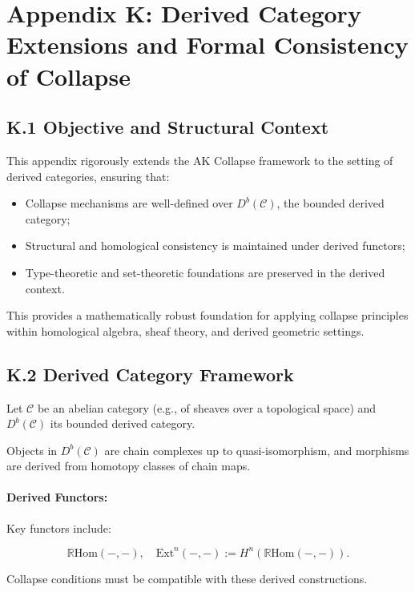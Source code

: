 \documentclass[11pt]{article}
\begin{document}
\section*{Appendix K: Derived Category Extensions and Formal Consistency of Collapse}

\subsection*{K.1 Objective and Structural Context}

This appendix rigorously extends the AK Collapse framework to the setting of derived categories, ensuring that:

\begin{itemize}
    \item Collapse mechanisms are well-defined over \( D^b(\mathcal{C}) \), the bounded derived category;
    \item Structural and homological consistency is maintained under derived functors;
    \item Type-theoretic and set-theoretic foundations are preserved in the derived context.
\end{itemize}

This provides a mathematically robust foundation for applying collapse principles within homological algebra, sheaf theory, and derived geometric settings.

\subsection*{K.2 Derived Category Framework}

Let \( \mathcal{C} \) be an abelian category (e.g., of sheaves over a topological space) and \( D^b(\mathcal{C}) \) its bounded derived category.

Objects in \( D^b(\mathcal{C}) \) are chain complexes up to quasi-isomorphism, and morphisms are derived from homotopy classes of chain maps.

\paragraph{Derived Functors:}
Key functors include:

\[
\mathbb{R}\mathrm{Hom}(-, -), \quad \mathrm{Ext}^n(-, -) := H^n(\mathbb{R}\mathrm{Hom}(-, -)).
\]

Collapse conditions must be compatible with these derived constructions.
\end{document}

